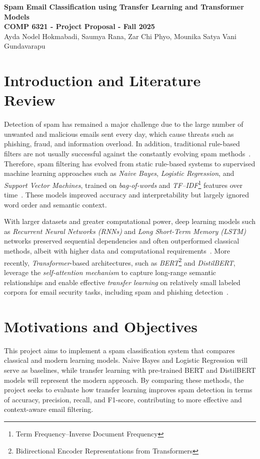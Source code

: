 \documentclass[12pt]{article}
\begin{document}
\begin{center}
{\Large \textbf{Spam Email Classification using Transfer Learning and Transformer Models}}\\[8pt]
{\small \textbf{COMP 6321 - Project Proposal - Fall 2025}}\\[5pt]
{\small Ayda Nodel Hokmabadi, Saumya Rana, Zar Chi Phyo, Mounika Satya Vani Gundavarapu}\\[3pt]
\end{center}


\section{Introduction and Literature Review}

Detection of spam has remained a major challenge due to the large number of unwanted and malicious emails sent every day, which cause threats such as phishing, fraud, and information overload. In addition, traditional rule-based filters are not usually successful against the constantly evolving spam methods~\cite{banday2009effectiveness,wang2025review}. Therefore, spam filtering has evolved from static rule-based systems to supervised machine learning approaches such as \textit{Naive Bayes}, \textit{Logistic Regression}, and \textit{Support Vector Machines}, trained on \textit{bag-of-words} and \textit{TF--IDF}\footnote{Term Frequency–Inverse Document Frequency} features over time~\cite{hassan2022analytics,chavez2020nb}. These models improved accuracy and interpretability but largely ignored word order and semantic context.

With larger datasets and greater computational power, deep learning models such as \textit{Recurrent Neural Networks (RNNs)} and \textit{Long Short-Term Memory (LSTM)} networks preserved sequential dependencies and often outperformed classical methods, albeit with higher data and computational requirements~\cite{johnafrica2022lstm,nasreen2024novel}. More recently, \textit{Transformer}-based architectures, such as \textit{BERT}\footnote{Bidirectional Encoder Representations from Transformers} and \textit{DistilBERT}, leverage the \textit{self-attention mechanism} to capture long-range semantic relationships and enable effective \textit{transfer learning} on relatively small labeled corpora for email security tasks, including spam and phishing detection~\cite{tida2022universal,songailaite2023bertphish,asliyuksek2025multimodal}.

\section{Motivations and Objectives}
This project aims to implement a spam classification system that compares classical and modern learning models. Naive Bayes and Logistic Regression will serve as baselines, while transfer learning with pre-trained BERT and DistilBERT models will represent the modern approach. By comparing these methods, the project seeks to evaluate how transfer learning improves spam detection in terms of accuracy, precision, recall, and F1-score, contributing to more effective and context-aware email filtering.
\end{document}
